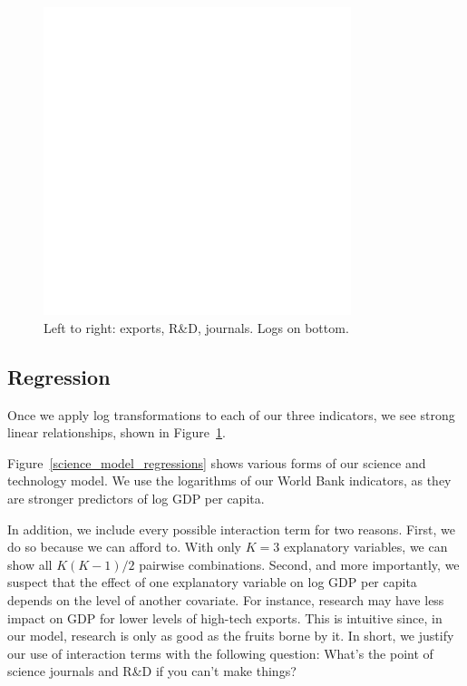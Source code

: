\documentclass[11pt]{article}
\begin{document}
\begin{figure}[!ht]
  \centering
  \includegraphics[width=0.8\textwidth]{images/science_model_scatter}
  \caption{\label{science_model_scatter}Left to right: exports, R\&D, journals. Logs on bottom.}
\end{figure}

\subsection{Regression}

Once we apply log transformations to each of our three indicators, we see strong linear relationships, shown in Figure~\ref{science_model_scatter}.

Figure~\ref{science_model_regressions} shows various forms of our science and technology model. We use the logarithms of our World Bank indicators, as they are stronger predictors of log GDP per capita.

In addition, we include every possible interaction term for two reasons.
First, we do so because we can afford to. With only $K=3$ explanatory variables, we can show all $K(K-1)/2$ pairwise combinations. 
Second, and more importantly, we suspect that the effect of one explanatory variable on log GDP per capita depends on the level of another covariate. For instance, research may have less impact on GDP for lower levels of high-tech exports. This is intuitive since, in our model, research is only as good as the fruits borne by it. In short, we justify our use of interaction terms with the following question: What's the point of science journals and R\&D if you can't make things?
\end{document}
